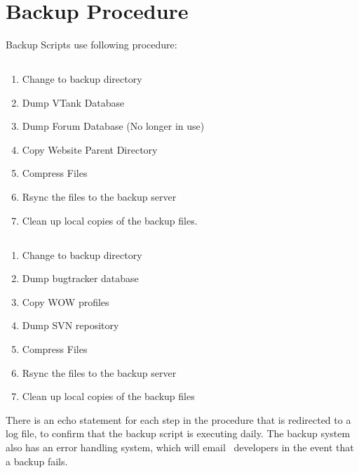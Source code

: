 \section{Backup Procedure}
Backup Scripts use following procedure:

\subsection{\MainServer}
\begin{enumerate}
\item Change to backup directory
\item Dump VTank Database
\item Dump Forum Database (No longer in use)
\item Copy Website Parent Directory
\item Compress Files
\item Rsync the files to the backup server
\item Clean up local copies of the backup files.
\end{enumerate}

\subsection{\WebServer}
\begin{enumerate}
\item Change to backup directory
\item Dump bugtracker database
\item Copy WOW profiles
\item Dump SVN repository
\item Compress Files
\item Rsync the files to the backup server
\item Clean up local copies of the backup files
\end{enumerate}

There is an echo statement for each step in the procedure that is redirected to a log file, to confirm that the backup script is executing daily.  The backup system also has an error handling system, which will email \VTank\ developers in the event that a backup fails.

